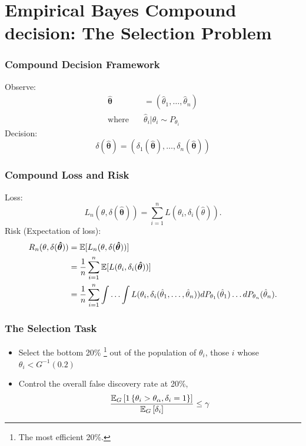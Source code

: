 \documentclass[10pt,mathserif,aspectratio=169]{beamer}
\begin{document}
\section{Empirical Bayes Compound decision: The Selection Problem}

\begin{frame}
  \frametitle{Compound Decision Framework}
  Observe:
  \begin{align*}
    \boldsymbol{\hat{\theta}} & =  (\hat{\theta}_1,\ldots, \hat{\theta}_n)  \\
    \text{where} \quad        & \hat{\theta}_i | \theta_i \sim P_{\theta_i}
  \end{align*}
  Decision:
  \begin{equation*}
    \delta(\boldsymbol{\hat{\theta}}) = (\delta_1(\boldsymbol{\hat{\theta}}), \ldots, \delta_n(\boldsymbol{\hat{\theta}}))
  \end{equation*}
\end{frame}

\begin{frame}
  \frametitle{Compound Loss and Risk}
  Loss:
  \begin{equation*}
    L_n(\theta, \delta(\boldsymbol{\hat{\theta}})) = \sum_{i=1}^n L(\theta_i, \delta_i(\hat{\theta})).
  \end{equation*}
  Risk (Expectation of loss):
  \begin{align*}
    R_n(\theta, \delta(\boldsymbol{\hat{\theta}})) & = \mathbb{E}[L_n(\theta, \delta(\boldsymbol{\hat{\theta}}))]                                                                                                                       \\
                                                   & = \frac{1}{n}\sum_{i=1}^n \mathbb{E}[L(\theta_i, \delta_i(\boldsymbol{\hat{\theta}}))]                                                                                             \\
                                                   & = \frac{1}{n}\sum_{i=1}^n \int \ldots \int L(\theta_i, \delta_i(\hat{\theta}_1, \ldots, \hat{\theta}_n))dP_{\theta_1}(\hat{\theta}_1)\ldots dP_{\theta_n}(\hat{\theta}_n). \\
  \end{align*}

\end{frame}

\begin{frame}
  \frametitle{The Selection Task}
  \begin{itemize}\itemsep=12pt
    \item Select the bottom 20\% \footnote{The most efficient 20\%.} out of the
          population of $\theta_i$, those $i$ whose $\theta_i<G^{-1}(0.2)$
    \item Control the overall false discovery rate at 20\%, \begin{equation*}
            \frac{\mathbb{E}_G\left[1\left\{\theta_i>\theta_{\alpha},\delta_i=1\right\}\right]}{\mathbb{E}_G\left[\delta_i\right]} \le \gamma
          \end{equation*}
  \end{itemize}
\end{frame}
\end{document}
